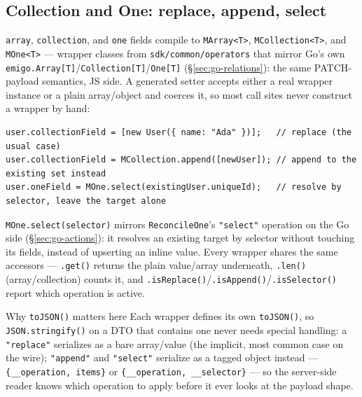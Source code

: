 \subsection{Collection and One: replace, append, select}
\texttt{array}, \texttt{collection}, and \texttt{one} fields compile to
\texttt{MArray<T>}, \texttt{MCollection<T>}, and \texttt{MOne<T>} ---
wrapper classes from \texttt{sdk/common/operators} that mirror Go's own
\texttt{emigo.Array[T]}/\texttt{Collection[T]}/\texttt{One[T]}
(\S\ref{sec:go-relations}): the same PATCH-payload semantics, JS side. A
generated setter accepts either a real wrapper instance or a plain
array/object and coerces it, so most call sites never construct a
wrapper by hand:
\begin{lstlisting}
user.collectionField = [new User({ name: "Ada" })];   // replace (the usual case)
user.collectionField = MCollection.append([newUser]); // append to the existing set instead
user.oneField = MOne.select(existingUser.uniqueId);   // resolve by selector, leave the target alone
\end{lstlisting}
\texttt{MOne.select(selector)} mirrors \texttt{ReconcileOne}'s
\texttt{"select"} operation on the Go side (\S\ref{sec:go-actions}): it
resolves an existing target by selector without touching its fields,
instead of upserting an inline value. Every wrapper shares the same
accessors --- \texttt{.get()} returns the plain value/array underneath,
\texttt{.len()} (array/collection) counts it, and
\texttt{.isReplace()}/\texttt{.isAppend()}/\texttt{.isSelector()} report
which operation is active.

\begin{sidebar}{Why \texttt{toJSON()} matters here}
Each wrapper defines its own \texttt{toJSON()}, so
\texttt{JSON.stringify()} on a DTO that contains one never needs special
handling: a \texttt{"replace"} serializes as a bare array/value (the
implicit, most common case on the wire); \texttt{"append"} and
\texttt{"select"} serialize as a tagged object instead ---
\texttt{\{\_\_operation, items\}} or \texttt{\{\_\_operation,
\_\_selector\}} --- so the server-side reader knows which operation to
apply before it ever looks at the payload shape.
\end{sidebar}

